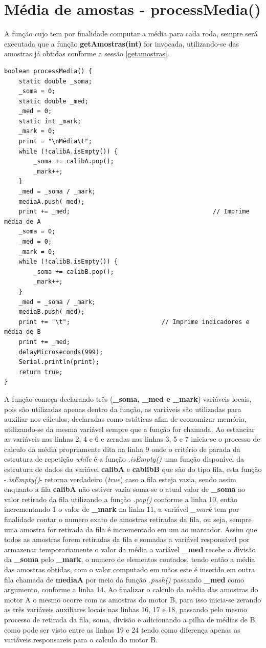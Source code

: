 \documentclass[a4paper,12pt,portuguese]{ufms-cpcx}
\begin{document}
\section{Média de amostas - processMedia()}\label{processmedia}
A função cujo tem por finalidade computar a média para cada roda, sempre será executada que a função \textbf{getAmostras(int)} for invocada, utilizando-se das amostras já obtidas conforme a sessão \ref{getamostras}.
\begin{lstlisting}
boolean processMedia() {
	static double _soma;
	_soma = 0;
	static double _med;
	_med = 0;
	static int _mark;
	_mark = 0;
	print = "\nMédia\t";
	while (!calibA.isEmpty()) {
		_soma += calibA.pop();
		_mark++;
	}
	_med = _soma / _mark;
	mediaA.push(_med);
	print += _med;                   			         // Imprime média de A
	_soma = 0;
	_med = 0;
	_mark = 0;
	while (!calibB.isEmpty()) {
		_soma += calibB.pop();
		_mark++;
	}
	_med = _soma / _mark;
	mediaB.push(_med);
	print += "\t";         			       // Imprime indicadores e média de B
	print += _med;
	delayMicroseconds(999);
	Serial.println(print);	
	return true;
}	
\end{lstlisting}
A função começa declarando três (\textbf{\_soma, \_med e \_mark}) variáveis locais, pois são utilizadas apenas dentro da função, as variáveis são utilizadas para auxiliar nos cálculos, declaradas como estáticas afim de economizar memória, utilizando-se da mesma variável sempre que a função for chamada. Ao estanciar as variáveis nas linhas 2, 4 e 6 e zeradas nas linhas 3, 5 e 7 inicia-se o processo de calculo da média propriamente dita na linha 9 onde o critério de parada da estrutura de repetição \textit{while} é a função \textit{.isEmpty()} uma função disponível da estrutura de dados da variável \textbf{calibA} e \textbf{cablibB} que são do tipo fila, esta função -\textit{.isEmpty()}- retorna verdadeiro (\textit{true}) caso a fila esteja vazia, sendo assim enquanto a fila \textbf{calibA} não estiver vazia soma-se o atual valor de \textbf{\_soma} ao valor retirado da fila utilizando a função \textit{.pop()} conforme a linha 10, então incrementando 1 o valor de \textbf{\_mark} na linha 11, a variável \textit{\_mark} tem por finalidade contar o numero exato de amostras retiradas da fila, ou seja, sempre uma amostra for retirada da fila é incrementado em um ao marcador. Assim que todos as amostras forem retiradas da fila e somadas a variável responsável por armazenar temporariamente o valor da média a variável \textbf{\_med} recebe a divisão da \textbf{\_soma} pelo \textbf{\_mark}, o numero de elementos contados, tendo então a média das amostras obtidas, com o valor computado em mãos este é inserido em outra fila chamada de \textbf{mediaA} por meio da função \textit{.push()} passando \textbf{\_med} como argumento, conforme a linha 14. Ao finalizar o calculo da média das amostras do motor A o mesmo ocorre com as amostras do motor B, para isso inicia-se zerando as três variáveis auxiliares locais nas linhas 16, 17 e 18, passando pelo mesmo processo de retirada da fila, soma, divisão e adicionando a pilha de médias de B, como pode ser visto entre as linhas 19 e 24 tendo como diferença apenas as variáveis responsareis para o calculo do motor B.
\end{document}
